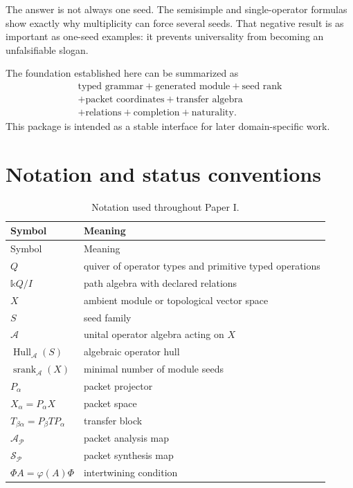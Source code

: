\documentclass[11pt]{article}
\theoremstyle{definition}
\theoremstyle{remark}
\newcommand{\cA}{\mathcal A}
\newcommand{\cP}{\mathcal P}
\newcommand{\Hull}{\operatorname{Hull}}
\newcommand{\srank}{\operatorname{srank}}
\newcommand{\bbk}{\mathbb{k}}
\begin{document}
The answer is not always one seed. The semisimple and single-operator formulas show exactly why multiplicity can force several seeds. That negative result is as important as one-seed examples: it prevents universality from becoming an unfalsifiable slogan.

The foundation established here can be summarized as
\[
\boxed{
\begin{gathered}
\text{typed grammar}+\text{generated module}+\text{seed rank}\\
+\text{packet coordinates}+\text{transfer algebra}\\
+\text{relations}+\text{completion}+\text{naturality}.
\end{gathered}
}
\]
This package is intended as a stable interface for later domain-specific work.

\appendix

\section{Notation and status conventions}

\begin{longtable}{L{0.21\textwidth}L{0.70\textwidth}}
\caption{Notation used throughout Paper I.}\label{tab:notation}\\
\toprule
Symbol & Meaning \\
\midrule
\endfirsthead
\toprule
Symbol & Meaning \\
\midrule
\endhead
$Q$ & quiver of operator types and primitive typed operations \\
$\bbk Q/I$ & path algebra with declared relations \\
$X$ & ambient module or topological vector space \\
$S$ & seed family \\
$\cA$ & unital operator algebra acting on $X$ \\
$\Hull_{\cA}(S)$ & algebraic operator hull \\
$\srank_{\cA}(X)$ & minimal number of module seeds \\
$P_{\alpha}$ & packet projector \\
$X_{\alpha}=P_{\alpha}X$ & packet space \\
$T_{\beta\alpha}=P_{\beta}TP_{\alpha}$ & transfer block \\
$\mathcal A_{\cP}$ & packet analysis map \\
$\mathcal S_{\cP}$ & packet synthesis map \\
$\Phi A=\varphi(A)\Phi$ & intertwining condition \\
\bottomrule
\end{longtable}
\end{document}
